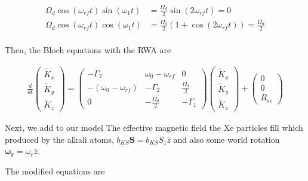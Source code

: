\documentclass{article}
\begin{document}
\begin{align}
    \Omega_d \cos{(\omega_{rf} t)}\sin(\omega_{1}t) &= \frac{\Omega_d}{2} \sin(2\omega_{rf}t)=0\\
    \Omega_d \cos{(\omega_{rf} t)}\cos(\omega_{1}t) &= \frac{\Omega_d}{2} \left(1+\cos(2\omega_{rf}t)\right)=\frac{\Omega_d}{2}\\
\end{align}

Then, the Bloch equations with the RWA are

\begin{align}
    \frac{d}{dt}\left(\begin{array}{c}
        \tilde{K}_{x}\\
        \tilde{K}_{y}\\
        \tilde{K}_{z}
    \end{array}\right)=
   \left(\begin{matrix}
    -\Gamma_2 & \omega_0-\omega_{rf}    &  0 \\
    -\left( \omega_0-\omega_{rf}\right) &  - \Gamma_2 &  \frac{\Omega_d}{2} \\ 0 &  -\frac{\Omega_d}{2}  &  -\Gamma_1 
    \end{matrix}\right)
    \left(\begin{array}{c}
        \tilde{K}_{x}\\
        \tilde{K}_{y}\\
        \tilde{K}_{z}
    \end{array}\right) + 
    \left(\begin{matrix}
         0  \\
         0  \\
         R_{se} 
    \end{matrix}\right)
\end{align}

Next, we add to our model The effective magnetic field the Xe particles fill which produced by the alkali atoms, $b_{KS}\mathbf{S}=b_{KS}S_z\hat{z}$ and also
some world rotation $\mathbf{\omega_r} = \omega_r\hat{z}$.

The modified equations are
\end{document}
